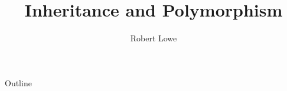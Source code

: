 \documentclass{beamer}
\title{Inheritance and Polymorphism}
\author{Robert Lowe\\}
\institute[Maryville College] %
{
  Division of Mathematics and Computer Science\\
  Maryville College
}
\date[]{}
\begin{document}
\begin{frame}
  \titlepage
\end{frame}

\begin{frame}{Outline}
  \tableofcontents
\end{frame}




\end{document}
